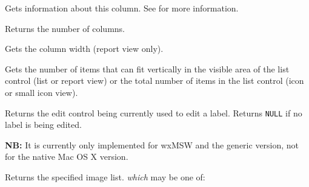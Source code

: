 \label{wxlistctrlgetcolumn}


Gets information about this column. See  for more
information.



\label{wxlistctrlgetcolumncount}


Returns the number of columns.


\label{wxlistctrlgetcolumnwidth}


Gets the column width (report view only).


\label{wxlistctrlgetcountperpage}


Gets the number of items that can fit vertically in the
visible area of the list control (list or report view)
or the total number of items in the list control (icon
or small icon view).


\label{wxlistctrlgeteditcontrol}


Returns the edit control being currently used to edit a label. Returns {\tt NULL}
if no label is being edited.

{\bf NB:} It is currently only implemented for wxMSW and the generic version,
not for the native Mac OS X version.


\label{wxlistctrlgetimagelist}


Returns the specified image list. {\it which} may be one of:

\twocolwidtha{5cm}
\begin{twocollist}\itemsep=0pt
\end{twocollist}


